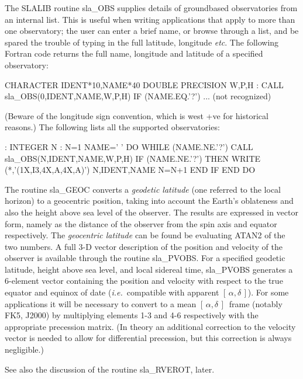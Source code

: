 \documentclass[11pt,twoside,nolof]{starlink}
\providecommand{\radec}     {$[\,\alpha,\delta\,]$}
\begin{document}
The SLALIB routine
sla\_OBS
supplies details of groundbased observatories from an internal
list.  This is useful when writing applications that apply to
more than one observatory;  the user can enter a brief name,
or browse through a list, and be spared the trouble of typing
in the full latitude, longitude \textit{etc}.  The following
Fortran code returns the full name, longitude and latitude
of a specified observatory:
\goodbreak
\begin{terminalv}
            CHARACTER IDENT*10,NAME*40
            DOUBLE PRECISION W,P,H
             :
            CALL sla_OBS(0,IDENT,NAME,W,P,H)
            IF (NAME.EQ.'?') ...             (not recognized)
\end{terminalv}
\goodbreak
(Beware of the longitude sign convention, which is west +ve
for historical reasons.)  The following lists all
the supported observatories:
\goodbreak
\begin{terminalv}
             :
            INTEGER N
             :
            N=1
            NAME=' '
            DO WHILE (NAME.NE.'?')
               CALL sla_OBS(N,IDENT,NAME,W,P,H)
               IF (NAME.NE.'?') THEN
                  WRITE (*,'(1X,I3,4X,A,4X,A)') N,IDENT,NAME
                  N=N+1
               END IF
            END DO
\end{terminalv}
\goodbreak
The routine
sla\_GEOC
converts a \textit{geodetic latitude}\/
(one referred to the local horizon) to a geocentric position,
taking into account the Earth's oblateness and also the height
above sea level of the observer.  The results are expressed in
vector form, namely as the distance of the observer from
the spin axis and equator respectively.  The \textit{geocentric
latitude}\/ can be found be evaluating ATAN2 of the
two numbers.  A full 3-D vector description of the position
and velocity of the observer is available through the routine
sla\_PVOBS.
For a specified geodetic latitude, height above
sea level, and local sidereal time,
sla\_PVOBS
generates a 6-element vector containing the position and
velocity with respect to the true equator and equinox of
date (\textit{i.e.}\ compatible with apparent \radec).  For
some applications it will be necessary to convert to a
mean \radec\ frame (notably FK5, J2000) by multiplying
elements 1-3 and 4-6 respectively with the appropriate
precession matrix.  (In theory an additional correction to the
velocity vector is needed to allow for differential precession,
but this correction is always negligible.)

See also the discussion of the routine
sla\_RVEROT,
later.
\end{document}

